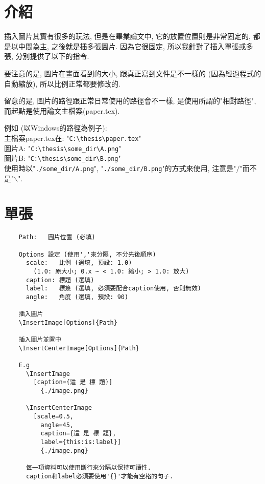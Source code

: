 \section{介紹}

插入圖片其實有很多的玩法, 但是在畢業論文中, 它的放置位置則是非常固定的, 都是以中間為主, 之後就是插多張圖片. 因為它很固定, 所以我針對了插入單張或多張, 分別提供了以下的指令.

要注意的是, 圖片在畫面看到的大小, 跟真正寫到文件是不一樣的 (因為經過程式的自動縮放), 所以比例正常都要修改的.

留意的是, 圖片的路徑跟正常日常使用的路徑會不一樣, 是使用所謂的"相對路徑", 而起點是使用論文主檔案(paper.tex).

\noindent 例如 (以Windows的路徑為例子):\\
主檔案paper.tex在: "\verb|C:\thesis\paper.tex|"\\
圖片A: "\verb|C:\thesis\some_dir\A.png|"\\
圖片B: "\verb|C:\thesis\some_dir\B.png|"\\
使用時以"\verb|./some_dir/A.png|", "\verb|./some_dir/B.png|"的方式來使用, 注意是"$/$"而不是"$\backslash$".


\newpage
\section{單張}

  \begin{framed}
  \begin{verbatim}
    Path:   圖片位置 (必填)

    Options 設定 (使用','來分隔, 不分先後順序)
      scale:   比例 (選填, 預設: 1.0)
        (1.0: 原大小; 0.x ~ < 1.0: 縮小; > 1.0: 放大)
      caption: 標題 (選填)
      label:   標簽 (選填, 必須要配合caption使用, 否則無效)
      angle:   角度 (選填, 預設: 90)

    插入圖片
    \InsertImage[Options]{Path}

    插入圖片並置中
    \InsertCenterImage[Options]{Path}

    E.g
      \InsertImage
        [caption={這 是 標 題}]
          {./image.png}

      \InsertCenterImage
        [scale=0.5,
          angle=45,
          caption={這 是 標 題},
          label={this:is:label}]
          {./image.png}

      每一項資料可以使用斷行來分隔以保持可讀性.
      caption和label必須要使用'{}'才能有空格的句子.
  \end{verbatim}
  \end{framed}


